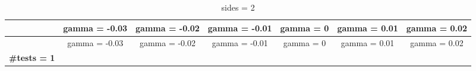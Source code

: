 \documentclass[
]{article}
\begin{document}
\begin{longtable}[]{@{}ccccccc@{}}
\caption{sides = 2}\tabularnewline
\toprule
\begin{minipage}[b]{0.13\columnwidth}\centering
~\strut
\end{minipage} & \begin{minipage}[b]{0.12\columnwidth}\centering
gamma = -0.03\strut
\end{minipage} & \begin{minipage}[b]{0.12\columnwidth}\centering
gamma = -0.02\strut
\end{minipage} & \begin{minipage}[b]{0.12\columnwidth}\centering
gamma = -0.01\strut
\end{minipage} & \begin{minipage}[b]{0.09\columnwidth}\centering
gamma = 0\strut
\end{minipage} & \begin{minipage}[b]{0.11\columnwidth}\centering
gamma = 0.01\strut
\end{minipage} & \begin{minipage}[b]{0.11\columnwidth}\centering
gamma = 0.02\strut
\end{minipage}\tabularnewline
\midrule
\endfirsthead
\toprule
\begin{minipage}[b]{0.13\columnwidth}\centering
~\strut
\end{minipage} & \begin{minipage}[b]{0.12\columnwidth}\centering
gamma = -0.03\strut
\end{minipage} & \begin{minipage}[b]{0.12\columnwidth}\centering
gamma = -0.02\strut
\end{minipage} & \begin{minipage}[b]{0.12\columnwidth}\centering
gamma = -0.01\strut
\end{minipage} & \begin{minipage}[b]{0.09\columnwidth}\centering
gamma = 0\strut
\end{minipage} & \begin{minipage}[b]{0.11\columnwidth}\centering
gamma = 0.01\strut
\end{minipage} & \begin{minipage}[b]{0.11\columnwidth}\centering
gamma = 0.02\strut
\end{minipage}\tabularnewline
\midrule
\endhead
\begin{minipage}[t]{0.13\columnwidth}\centering
\textbf{\#tests = 1}\strut
\end{minipage} & \begin{minipage}[t]{0.12\columnwidth}\centering

\end{minipage}
\end{longtable}
\end{document}
